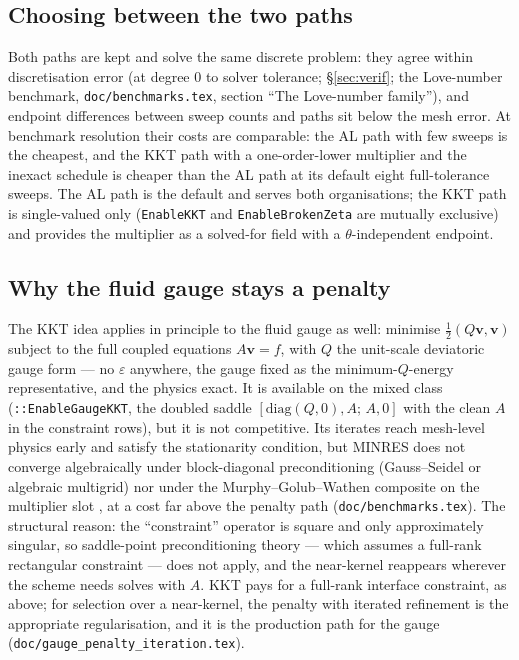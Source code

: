 \documentclass[11pt]{article}
\newcommand{\eps}{\varepsilon}
\newcommand{\bv}{\mathbf{v}}
\begin{document}
\subsection{Choosing between the two paths}

Both paths are kept and solve the same discrete problem: they agree
within discretisation error (at degree 0 to solver tolerance;
\S\ref{sec:verif}; the Love-number benchmark, \texttt{doc/benchmarks.tex},
section ``The Love-number family''), and endpoint differences between
sweep counts and paths sit below the mesh error. At benchmark
resolution their costs are comparable: the AL path with few sweeps is
the cheapest, and the KKT path with a one-order-lower multiplier and the
inexact schedule is cheaper than the AL path at its default eight
full-tolerance sweeps. The AL path is the default and serves both
organisations; the KKT path is single-valued only (\texttt{EnableKKT}
and \texttt{EnableBrokenZeta} are mutually exclusive) and provides the
multiplier as a solved-for field with a $\theta$-independent endpoint.

\subsection{Why the fluid gauge stays a penalty}
\label{sec:gaugekkt}

The KKT idea applies in principle to the fluid gauge as well: minimise
$\tfrac12 (Q\bv, \bv)$ subject to the full coupled equations
$A\bv = f$, with $Q$ the unit-scale deviatoric gauge form --- no $\eps$
anywhere, the gauge fixed as the minimum-$Q$-energy representative, and
the physics exact. It is available on the mixed class
(\texttt{::EnableGaugeKKT},
the doubled saddle $[\mathrm{diag}(Q,0), A;\, A, 0]$ with the clean $A$
in the constraint rows), but it is not competitive. Its iterates reach
mesh-level physics early and satisfy the stationarity condition, but
MINRES does not converge algebraically under block-diagonal
preconditioning (Gauss--Seidel or algebraic multigrid) nor under the
Murphy--Golub--Wathen composite on the multiplier slot
\cite{MurphyGolubWathen2000}, at a cost far above the penalty path
(\texttt{doc/benchmarks.tex}). The structural reason: the
``constraint'' operator is square and only approximately singular, so
saddle-point preconditioning theory --- which assumes a full-rank
rectangular constraint --- does not apply, and the near-kernel
reappears wherever the scheme needs solves with $A$. KKT pays for a
full-rank interface constraint, as above; for selection over a
near-kernel, the penalty with iterated refinement is the appropriate
regularisation, and it is the production path for the gauge
(\texttt{doc/gauge\_penalty\_iteration.tex}).
\end{document}
